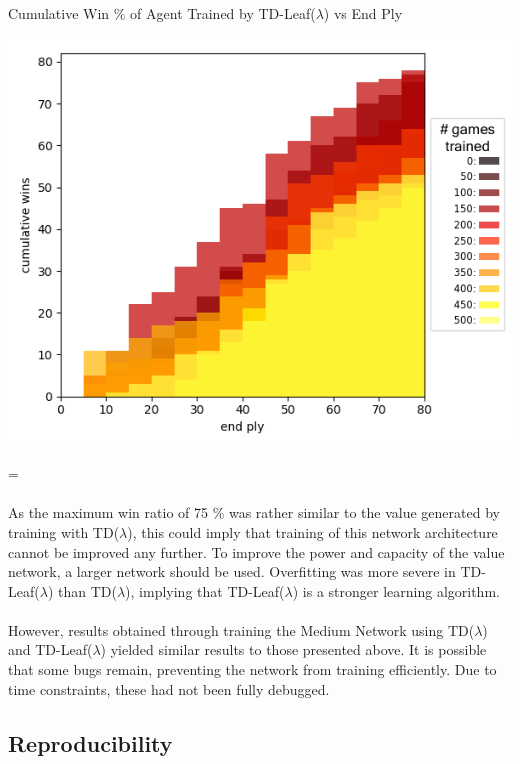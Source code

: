 \documentclass[12pt,a4paper]{book}
\newenvironment{absolutelynopagebreak}
{\par\nobreak\vfil\penalty0\vfilneg
  \vtop\bgroup}
{\par\xdef\tpd{\the\prevdepth}\egroup
  \prevdepth=\tpd}
\begin{document}
\begin{absolutelynopagebreak}
\begin{center}
  \centerline{Cumulative Win \% of Agent Trained by TD-Leaf($\lambda$) vs End Ply}
  \includegraphics[scale=0.5]{leaf.png}
\end{center}
\end{absolutelynopagebreak}

\paragraph{} As the maximum win ratio of 75 \% was rather similar to the value generated by training with TD($\lambda$), this could imply that training of this network architecture cannot be improved any further. To improve the power and capacity of the value network, a larger network should be used. Overfitting was more severe in TD-Leaf($\lambda$) than TD($\lambda$), implying that TD-Leaf($\lambda$) is a stronger learning algorithm.

\paragraph{} However, results obtained through training the Medium Network using TD($\lambda$) and TD-Leaf($\lambda$) yielded similar results to those presented above. It is possible that some bugs remain, preventing the network from training efficiently. Due to time constraints, these had not been fully debugged.

\subsection{Reproducibility}
\end{document}
